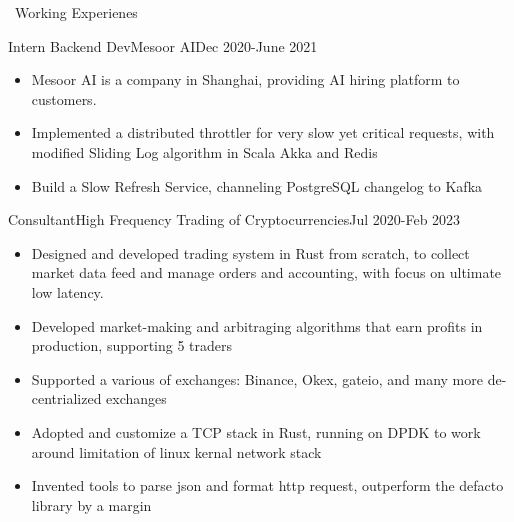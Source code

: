 \documentclass{resume}
\begin{document}
\begin{rSection}{\faUsers~Working Experienes}
    \begin{rExperience}{Intern Backend Dev}{Mesoor AI}{Dec 2020-June 2021}
        \begin{itemize}
            \itemsep -0.5em \vspace{-0.5em}
            \item Mesoor AI is a company in Shanghai, providing AI hiring platform to customers.
            \item Implemented a distributed throttler for very slow yet critical requests, with modified Sliding Log algorithm in Scala Akka and Redis
            \item Build a Slow Refresh Service, channeling PostgreSQL changelog to Kafka       
        \end{itemize}
    \end{rExperience}
    \begin{rExperience}{Consultant}{High Frequency Trading of Cryptocurrencies}{Jul 2020-Feb 2023}
        \begin{itemize}
            \itemsep -0.5em \vspace{-0.5em}
            \item Designed and developed trading system in Rust from scratch, to collect market data feed and manage orders and accounting, with focus on ultimate low latency.
            \item Developed market-making and arbitraging algorithms that earn profits in production, supporting 5 traders
            \item Supported a various of exchanges: Binance, Okex, gateio, and many more de-centrialized exchanges
            \item Adopted and customize a TCP stack in Rust, running on DPDK to work around limitation of linux kernal network stack
            \item Invented tools to parse json and format http request, outperform the defacto library by a margin
        \end{itemize}
    \end{rExperience}

\end{rSection}
\end{document}
